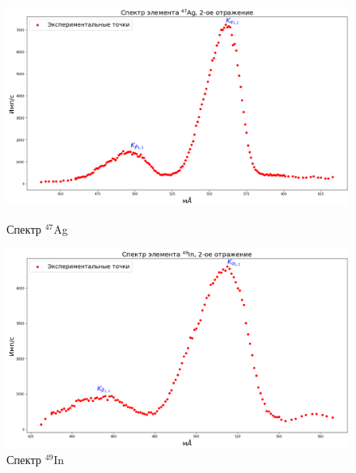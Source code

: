 \documentclass[a4paper, 12pt]{article}%
\begin{document}
		\begin{figure}[h!]
			\begin{minipage}[h]{0.49\textwidth}
				\begin{center}
					\includegraphics[width=1.02\linewidth]{Спектры/Ag.png}
					\caption{Спектр $^{47}$Ag}
				\end{center}
			\end{minipage}
			\hfill
			\begin{minipage}[h]{0.49\textwidth}
				\begin{center}
					\includegraphics[width=1.02\linewidth]{Спектры/In.png}
					\caption{Спектр $^{49}$In}
				\end{center}
			\end{minipage}
		\end{figure}

		\newpage
\end{document}
